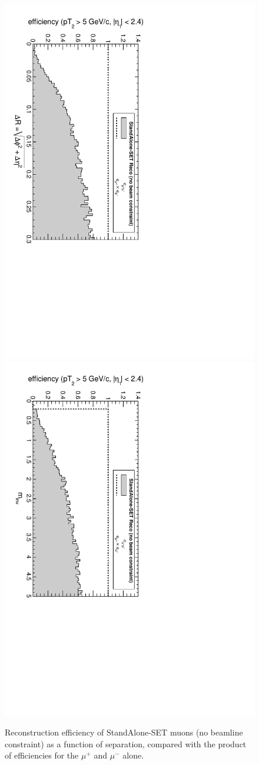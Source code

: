 \documentclass[12pt]{article}
\begin{document}
\begin{figure}[p]
\includegraphics[height=0.5\linewidth, angle=90]{fig/acceptance6_plot/vsdR_StandAloneSET.pdf}
\includegraphics[height=0.5\linewidth, angle=90]{fig/acceptance6_plot/vsmass_StandAloneSET.pdf}

\caption{Reconstruction efficiency of StandAlone-SET muons (no beamline constraint) as a function of
  separation, compared with the product of efficiencies for the
  $\mu^+$ and $\mu^-$ alone. \label{fig:vseverything_StandAloneSET}}
\end{figure}
\end{document}
